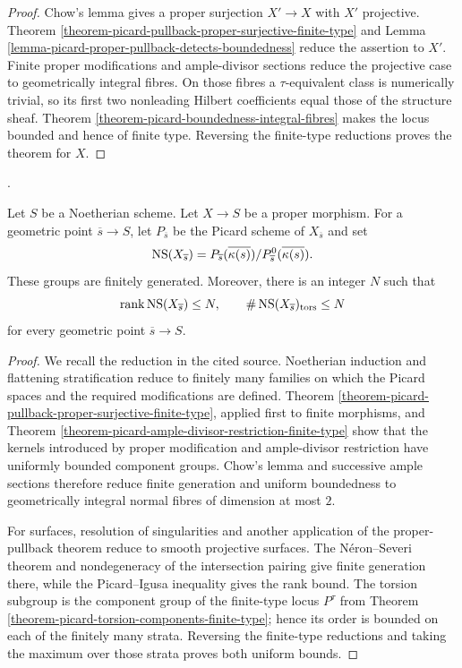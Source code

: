 \begin{proof}
Chow's lemma gives a proper surjection $X' \to X$ with $X'$ projective.
Theorem \ref{theorem-picard-pullback-proper-surjective-finite-type} and Lemma
\ref{lemma-picard-proper-pullback-detects-boundedness} reduce the assertion to
$X'$. Finite proper modifications and ample-divisor sections reduce the
projective case to geometrically integral fibres. On those fibres a
$\tau$-equivalent class is numerically trivial, so its first two
nonleading Hilbert coefficients equal those of the structure sheaf.
Theorem \ref{theorem-picard-boundedness-integral-fibres} makes the locus
bounded and hence of finite type. Reversing the finite-type reductions proves
the theorem for $X$.
\end{proof}

\begin{theorem}
\label{theorem-picard-neron-severi-uniform-bounds}
\begin{reference}
\cite[Supplement to Expos\'e 236, (vi), pp. 304--305]{FGA}.
\end{reference}
Let $S$ be a Noetherian scheme. Let $X \to S$ be a proper morphism. For a
geometric point $\overline{s} \to S$, let $P_{\overline{s}}$ be the Picard
scheme of
$X_{\overline{s}}$ and set
$$
\mathop{\rm NS}(X_{\overline{s}})
= P_{\overline{s}}(\overline{\kappa(s)})/
P^0_{\overline{s}}(\overline{\kappa(s)}).
$$
These groups are finitely generated. Moreover, there is an integer $N$ such
that
$$
\mathop{\rm rank} \mathop{\rm NS}(X_{\overline{s}}) \leq N,
\qquad
\#\mathop{\rm NS}(X_{\overline{s}})_{\rm tors} \leq N
$$
for every geometric point $\overline{s} \to S$.
\end{theorem}

\begin{proof}
We recall the reduction in the cited source. Noetherian induction and
flattening stratification reduce to finitely many families on which the
Picard spaces and the required modifications are defined. Theorem
\ref{theorem-picard-pullback-proper-surjective-finite-type}, applied first to
finite morphisms, and Theorem
\ref{theorem-picard-ample-divisor-restriction-finite-type} show that the
kernels introduced by proper modification and ample-divisor restriction have
uniformly bounded component groups. Chow's lemma and successive ample
sections therefore reduce finite generation and uniform boundedness to
geometrically integral normal fibres of dimension at most $2$.

For surfaces, resolution of singularities and another application of the
proper-pullback theorem reduce to smooth projective surfaces. The
N\'eron--Severi theorem and nondegeneracy of the intersection pairing give
finite generation there, while the Picard--Igusa inequality gives the rank
bound. The torsion subgroup is the component group of the finite-type locus
$P^\tau$ from Theorem
\ref{theorem-picard-torsion-components-finite-type}; hence its order is
bounded on each of the finitely many strata. Reversing the finite-type
reductions and taking the maximum over those strata proves both uniform
bounds.
\end{proof}

